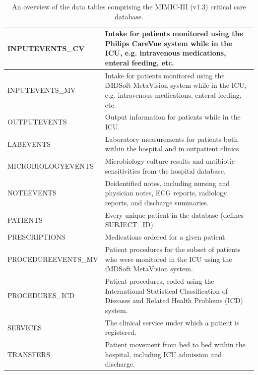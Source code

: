\documentclass[english]{article}
\begin{document}
\begin{center}
\begin{table}
\begin{tabular}{|l|p{10.5cm}|}
    \hline
    INPUTEVENTS\_CV & Intake for patients monitored using the Philips CareVue system while in the ICU, e.g. intravenous medications, enteral feeding, etc. \\
    \hline
    INPUTEVENTS\_MV & Intake for patients monitored using the iMDSoft MetaVision system while in the ICU, e.g. intravenous medications, enteral feeding, etc. \\
    \hline
    OUTPUTEVENTS & Output information for patients while in the ICU. \\
    \hline
    LABEVENTS & Laboratory measurements for patients both within the hospital and in outpatient clinics. \\
    \hline
    MICROBIOLOGYEVENTS & Microbiology culture results and antibiotic sensitivities from the hospital database. \\
    \hline
    NOTEEVENTS & Deidentified notes, including nursing and physician notes, ECG reports, radiology reports, and discharge summaries. \\
    \hline
    PATIENTS & Every unique patient in the database (defines SUBJECT\_ID). \\
    \hline
    PRESCRIPTIONS & Medications ordered for a given patient. \\
    \hline
    PROCEDUREEVENTS\_MV & Patient procedures for the subset of patients who were monitored in the ICU using the iMDSoft MetaVision system. \\
    \hline
    PROCEDURES\_ICD & Patient procedures, coded using the International Statistical Classification of Diseases and Related Health Problems (ICD) system. \\
    \hline
    SERVICES & The clinical service under which a patient is registered. \\
    \hline
    TRANSFERS & Patient movement from bed to bed within the hospital, including ICU admission and discharge. \\
    \hline
\end{tabular}
\caption{An overview of the data tables comprising the MIMIC-III (v1.3) critical care database.}
\label{table:mimictables}
\end{table}
\end{center}
\end{document}
